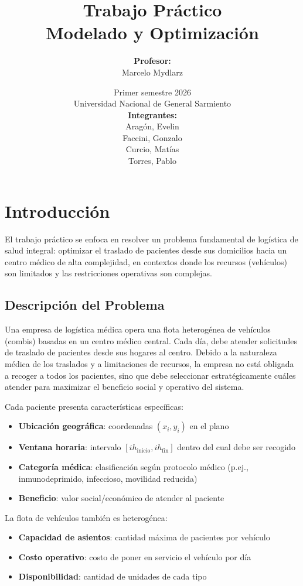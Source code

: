 \documentclass[12pt]{article}
\title{\Huge Trabajo Práctico\\\Large Modelado y Optimización}
\date{
    \large Primer semestre 2026 \\
    Universidad Nacional de General Sarmiento \\
    \vspace{2cm}
    \hfill \textbf{Integrantes:}\\
    \hfill Aragón, Evelin\\
    \hfill Faccini, Gonzalo\\
    \hfill Curcio, Matías\\
    \hfill Torres, Pablo
}
\author{\textbf{Profesor:}\\Marcelo Mydlarz}
\numberwithin{algorithm}{section}
\begin{document}
\maketitle
\newpage
\tableofcontents
\newpage

\setcounter{section}{-1}

\section{Introducción}

El trabajo práctico se enfoca en resolver un problema fundamental de logística de salud integral: optimizar el traslado de pacientes desde sus domicilios hacia un centro médico de alta complejidad, en contextos donde los recursos (vehículos) son limitados y las restricciones operativas son complejas.

\subsection{Descripción del Problema}

Una empresa de logística médica opera una flota heterogénea de vehículos (combis) basadas en un centro médico central. Cada día, debe atender solicitudes de traslado de pacientes desde sus hogares al centro. Debido a la naturaleza médica de los traslados y a limitaciones de recursos, la empresa no está obligada a recoger a todos los pacientes, sino que debe seleccionar estratégicamente cuáles atender para maximizar el beneficio social y operativo del sistema.

Cada paciente presenta características específicas:
\begin{itemize}
    \item \textbf{Ubicación geográfica}: coordenadas $(x_i, y_i)$ en el plano
    \item \textbf{Ventana horaria}: intervalo $[ih_{\text{inicio}}, ih_{\text{fin}}]$ dentro del cual debe ser recogido
    \item \textbf{Categoría médica}: clasificación según protocolo médico (p.ej., inmunodeprimido, infeccioso, movilidad reducida)
    \item \textbf{Beneficio}: valor social/económico de atender al paciente
\end{itemize}

La flota de vehículos también es heterogénea:
\begin{itemize}
    \item \textbf{Capacidad de asientos}: cantidad máxima de pacientes por vehículo
    \item \textbf{Costo operativo}: costo de poner en servicio el vehículo por día
    \item \textbf{Disponibilidad}: cantidad de unidades de cada tipo
\end{itemize}
\end{document}
